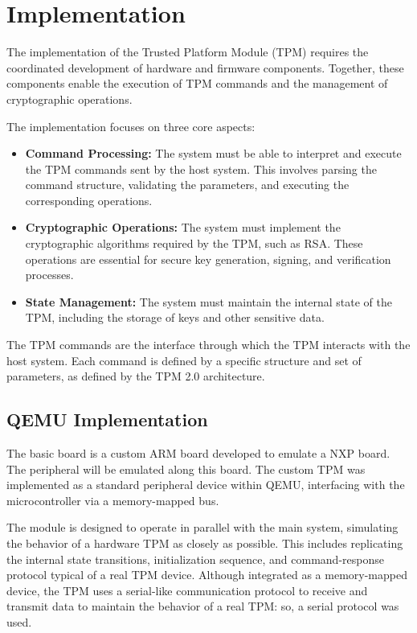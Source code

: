 \chapter{Implementation}
\label{chap2}

The implementation of the Trusted Platform Module (TPM) 
requires the coordinated development of hardware and 
firmware components. 
Together, these components enable the execution of 
TPM commands and the management of cryptographic 
operations. 

The implementation focuses on three core aspects:
\begin{itemize}
    \item \textbf{Command Processing:} The system must
    be able to interpret and execute the TPM commands
    sent by the host system. This involves parsing the
    command structure, validating the parameters, and
    executing the corresponding operations.
    \item \textbf{Cryptographic Operations:} The system
    must implement the cryptographic algorithms required
    by the TPM, such as RSA. These
    operations are essential for secure key generation,
    signing, and verification processes.
    \item \textbf{State Management:} The system must
    maintain the internal state of the TPM, including
    the storage of keys and other sensitive
    data. 
\end{itemize}

The TPM commands are the interface through which the
TPM interacts with the host system. Each command is
defined by a specific structure and set of parameters,
as defined by the TPM 2.0 architecture.

\section{QEMU Implementation}
    The basic board is a custom ARM board developed to emulate a NXP board. 
    The peripheral will be emulated along this board. 
    The custom TPM was implemented as a standard peripheral device within QEMU, 
    interfacing with the microcontroller via a memory-mapped bus. 


    The module is designed to operate in parallel with the main system, 
    simulating the behavior of a hardware TPM as closely as possible. 
    This includes replicating the internal state transitions, initialization sequence, 
    and command-response protocol typical of a real TPM device.
    Although integrated as a memory-mapped device, the TPM uses a serial-like communication 
    protocol to receive and transmit data to maintain the behavior of a real TPM:
    so, a serial protocol was used. 
    
